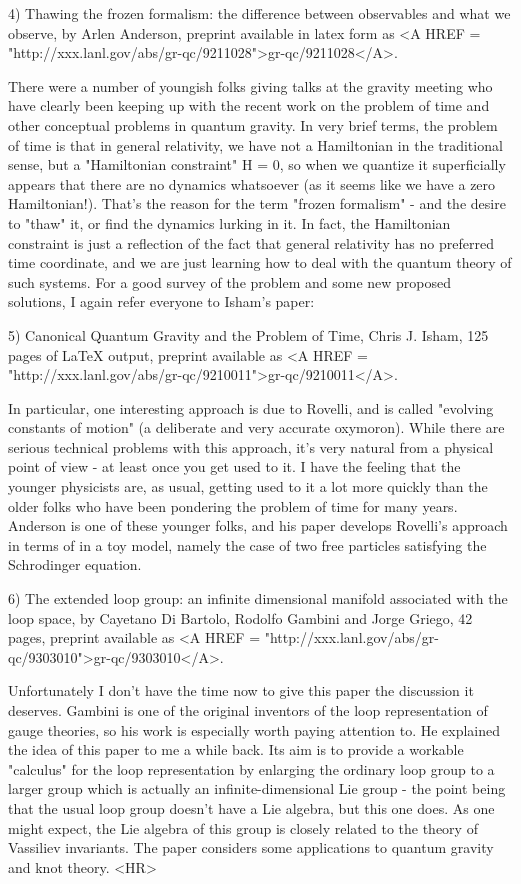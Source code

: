 4)  Thawing the frozen formalism: the difference between observables and
what we observe, by Arlen Anderson, preprint available in latex form as
<A HREF = "http://xxx.lanl.gov/abs/gr-qc/9211028">gr-qc/9211028</A>. 

There were a number of youngish folks giving talks at the gravity
meeting who have clearly been keeping up with the recent work on the
problem of time and other conceptual problems in quantum gravity.  In
very brief terms, the problem of time is that in general relativity, we
have not a Hamiltonian in the traditional sense, but a "Hamiltonian
constraint" H = 0, so when we quantize it superficially appears that
there are no dynamics whatsoever (as it seems like we have a zero 
Hamiltonian!).  That's the reason for the term "frozen formalism" - and
the desire to "thaw" it, or find the dynamics lurking in it.  In fact,
the Hamiltonian constraint is just a reflection of the fact that general
relativity has no preferred time coordinate, and we are just learning
how to deal with the quantum theory of such systems.  For a good survey
of the problem and some new proposed solutions, I again refer everyone
to Isham's paper:

5) Canonical Quantum Gravity and the Problem of Time,
Chris J. Isham, 125 pages of LaTeX output, preprint available as
<A HREF = "http://xxx.lanl.gov/abs/gr-qc/9210011">gr-qc/9210011</A>.

In particular, one interesting approach is due to Rovelli, and is called 
"evolving constants of motion" (a deliberate and very accurate
oxymoron).  While there are serious technical problems with this
approach, it's very natural from a physical point of view - at least
once you get used to it.   I have the feeling that the younger
physicists are, as usual, getting used to it a lot more quickly than the
older folks who have been pondering the problem of time for many years. 
Anderson is one of these younger folks, and his paper develops Rovelli's
approach in terms of  in a toy model, namely the case of two free
particles satisfying the Schrodinger equation.  

6) The extended loop group: an infinite dimensional manifold associated
with the loop space, by Cayetano Di Bartolo, Rodolfo Gambini and Jorge
Griego, 42 pages, preprint available as <A HREF = "http://xxx.lanl.gov/abs/gr-qc/9303010">gr-qc/9303010</A>.

Unfortunately I don't have the time now to give this paper the
discussion it deserves.  Gambini is one of the original inventors of the
loop representation of gauge theories, so his work is especially worth
paying attention to.  He explained the idea of this paper to me a while
back.  Its aim is to provide a workable "calculus" for the loop
representation by enlarging the ordinary loop group to a larger group
which is actually an infinite-dimensional Lie group - the point being
that the usual loop group doesn't have a Lie algebra, but this one does.
As one might expect, the Lie algebra of this group is closely related to
the theory of Vassiliev invariants.  The paper considers some
applications to quantum gravity and knot theory.
<HR>



